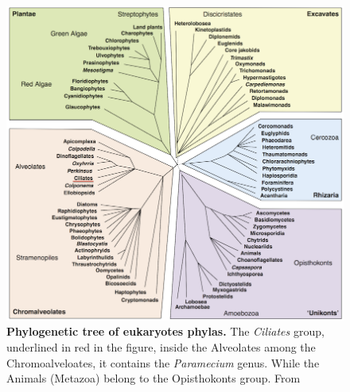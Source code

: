 \documentclass[10pt]{article}
\begin{document}
\begin{figure}[!ht]
\begin{center}
\includegraphics[scale=2.2]{Figures/TreeOfEuk.png}
\end{center}
\caption{
{\bf Phylogenetic tree of eukaryotes phylas.} The \textit{Ciliates} group, underlined in red in the figure, inside the Alveolates among the Chromoalveloates, it contains the \textit{Paramecium} genus. While the Animals (Metazoa) belong to the Opisthokonts group. From~\citep{keeling_tree_2005}
} 
\label{fig:TreeOfEuk}
\end{figure}
\end{document}
